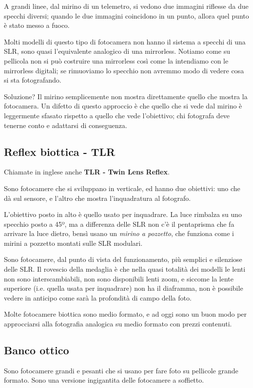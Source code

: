 A grandi linee, dal mirino di un telemetro, si vedono due immagini riflesse da due specchi diversi; quando le due immagini coincidono in un punto, allora quel punto è stato messo a fuoco.

Molti modelli di questo tipo di fotocamera non hanno il sistema a specchi di una SLR, sono quasi l'equivalente analogico di una mirrorless.
Notiamo come su pellicola non si può costruire una mirrorless così come la intendiamo con le mirrorless digitali; se rimuoviamo lo specchio non avremmo modo di vedere cosa si sta fotografando.

Soluzione? Il mirino semplicemente non mostra direttamente quello che mostra la fotocamera. Un difetto di questo approccio è che quello che si vede dal mirino è leggermente sfasato rispetto a quello che vede l'obiettivo; chi fotografa deve tenerne conto e adattarsi di conseguenza.


\subsection{Reflex biottica - TLR} \label{subsec:tlr}
Chiamate in inglese anche \textbf{TLR - Twin Lens Reflex}.

Sono fotocamere che si sviluppano in verticale, ed hanno due obiettivi: uno che dà sul sensore, e l'altro che mostra l'inquadratura al fotografo.

L'obiettivo posto in alto è quello usato per inquadrare. La luce rimbalza su uno specchio posto a 45º, ma a differenza delle SLR non c'è il pentaprisma che fa arrivare la luce dietro, bensì usano un \textit{mirino a pozzetto}, che funziona come i mirini a pozzetto montati sulle SLR modulari.

Sono fotocamere, dal punto di vista del funzionamento, più semplici e silenziose delle SLR.
Il rovescio della medaglia è che nella quasi totalità dei modelli le lenti non sono interscambiabili, non sono disponibili lenti zoom, e siccome la lente superiore (i.e. quella usata per inquadrare) non ha il diaframma, non è possibile vedere in anticipo come sarà la profondità di campo della foto.

Molte fotocamere biottica sono medio formato, e ad oggi sono un buon modo per approcciarsi alla fotografia analogica su medio formato con prezzi contenuti.


\subsection{Banco ottico} \label{subsec:bancoottico}
Sono fotocamere grandi e pesanti che si usano per fare foto su pellicole grande formato. Sono una versione ingigantita delle fotocamere a soffietto.

